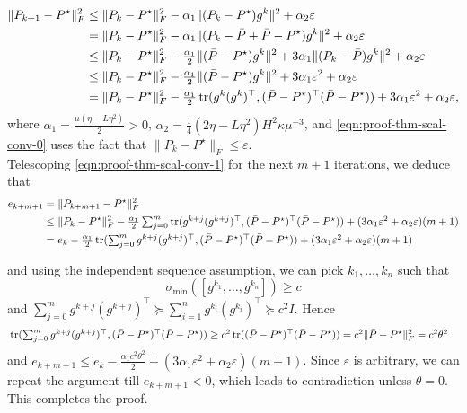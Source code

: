 \begin{align}
  \| P_{k + 1} - P^{\star} \|_F^2 \leq{} & \| P_k - P^{\star} \|_F^2 - \alpha_1
  \| (P_k - P^{\star}) g^k \|^2 + \alpha_2 \varepsilon \nonumber\\
  ={} & \| P_k - P^{\star} \|_F^2 - \alpha_1 \| (P_k - \bar{P} + \bar{P} -
  P^{\star}) g^k \|^2 + \alpha_2 \varepsilon \nonumber\\
  \leq{} & \| P_k - P^{\star} \|_F^2 - \tfrac{\alpha_1}{2} \| (\bar{P} -
  P^{\star}) g^k \|^2 + 3 \alpha_1 \| (P_k - \bar{P}) g^k \|^2 + \alpha_2
  \varepsilon \nonumber\\
  \leq{} & \| P_k - P^{\star} \|_F^2 - \tfrac{\alpha_1}{2} \| (\bar{P} -
  P^{\star}) g^k \|^2 + 3 \alpha_1 \varepsilon^2 + \alpha_2 \varepsilon
  \label{eqn:proof-thm-scal-conv-0} \\
  ={} & \| P_k - P^{\star} \|_F^2 - \tfrac{\alpha_1}{2} \operatorname{tr} (g^k
  (g^k)^{\top}, (\bar{P} - P^{\star})^{\top} (\bar{P} - P^{\star})) + 3
  \alpha_1 \varepsilon^2 + \alpha_2 \varepsilon ,\label{eqn:proof-thm-scal-conv-1}
\end{align}
where $\alpha_1 = \tfrac{\mu (\eta - L \eta^2)}{2} > 0$, $\alpha_2 = \frac{1}{4}
(2\eta - L \eta^2) H^2 \kappa \mu^{- 3}$, and \eqref{eqn:proof-thm-scal-conv-0} uses the fact that $\| P_k - P^{\star} \|_F\leq \varepsilon$.\\
Telescoping \eqref{eqn:proof-thm-scal-conv-1} for the next $m + 1$ iterations, we deduce that
\begin{align}
  e_{k + m + 1} ={} & \| P_{k + m + 1} - P^{\star} \|_F^2 \nonumber\\
  \leq{} & \| P_k - P^{\star} \|_F^2 - \tfrac{\alpha_1}{2} \textstyle \sum_{j = 0}^m
  \operatorname{tr} (g^{k + j} (g^{k + j})^{\top}, (\bar{P} - P^{\star})^{\top} (\bar{P} -
  P^{\star})) + (3 \alpha_1 \varepsilon^2 + \alpha_2 \varepsilon) (m + 1)
  \nonumber\\
  ={} & e_k - \tfrac{\alpha_1}{2} \operatorname{tr} ( \textstyle \sum_{j = 0}^m g^{k + j}
  (g^{k + j})^{\top}, (\bar{P} - P^{\star})^{\top} (\bar{P} - P^{\star})) +
  (3 \alpha_1 \varepsilon^2 + \alpha_2 \varepsilon) (m + 1) \nonumber
\end{align}

and using the independent sequence assumption, we can pick $k_1, \ldots, k_n$
such that
\[ \sigma_{\min} ([g^{k_1}, \ldots, g^{k_n}]) \geq c \]
and $\sum_{j = 0}^m g^{k + j} (g^{k + j})^{\top} \succeq \sum_{i = 1}^n
g^{k_i} (g^{k_i})^{\top} \succeq c^2 I$. Hence
\begin{align}
 & \textstyle \operatorname{tr} (\sum_{j = 0}^m g^{k + j} (g^{k + j})^{\top}, (\bar{P} -
  P^{\star})^{\top} (\bar{P} - P^{\star})) \geq{}  c^2 \operatorname{tr} ((\bar{P} - P^{\star})^{\top} (\bar{P} -
  P^{\star})) 
  ={}  c^2 \| \bar{P} - P^{\star} \|_F^2 = c^2 \theta^2 \nonumber
\end{align}
and $e_{k + m + 1} \leq e_k - \frac{\alpha_1 c^2 \theta^2}{2} + (3 \alpha_1 \varepsilon^2 + \alpha_2\varepsilon) (m + 1)$. Since $\varepsilon$ is arbitrary, we can repeat the argument till $e_{k + m +1} <0 $, which leads to contradiction unless $\theta = 0$. This completes the proof.